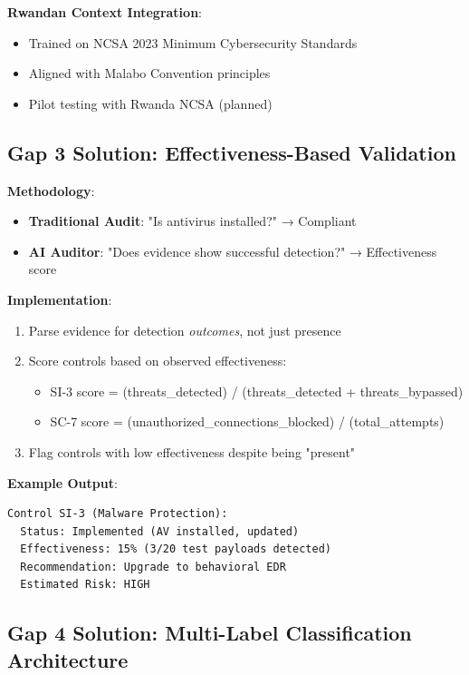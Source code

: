 \documentclass[11pt,conference]{IEEEtran}
\begin{document}
\textbf{Rwandan Context Integration}:
\begin{itemize}
    \item Trained on NCSA 2023 Minimum Cybersecurity Standards
    \item Aligned with Malabo Convention principles
    \item Pilot testing with Rwanda NCSA (planned)
\end{itemize}

\subsection{Gap 3 Solution: Effectiveness-Based Validation}

\textbf{Methodology}:
\begin{itemize}
    \item \textbf{Traditional Audit}: "Is antivirus installed?" → Compliant
    \item \textbf{AI Auditor}: "Does evidence show successful detection?" → Effectiveness score
\end{itemize}

\textbf{Implementation}:
\begin{enumerate}
    \item Parse evidence for detection \textit{outcomes}, not just presence
    \item Score controls based on observed effectiveness:
    \begin{itemize}
        \item SI-3 score = (threats\_detected) / (threats\_detected + threats\_bypassed)
        \item SC-7 score = (unauthorized\_connections\_blocked) / (total\_attempts)
    \end{itemize}
    \item Flag controls with low effectiveness despite being "present"
\end{enumerate}

\textbf{Example Output}:
\begin{verbatim}
Control SI-3 (Malware Protection):
  Status: Implemented (AV installed, updated)
  Effectiveness: 15% (3/20 test payloads detected)
  Recommendation: Upgrade to behavioral EDR
  Estimated Risk: HIGH
\end{verbatim}

\subsection{Gap 4 Solution: Multi-Label Classification Architecture}
\end{document}
